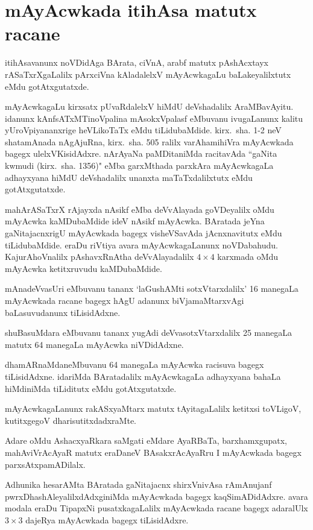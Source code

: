 \chapter{mAyAcwkada itihAsa matutx racane}

itihAsavanunx noVDidAga BArata, ciVnA, arabf matutx pAshAcxtayx rASaTxrXgaLalilx pArxciVna kAladalelxV mAyAcwkagaLu baLakeyalilxtutx eMdu gotAtxgutatxde.

mAyAcwkagaLu kirxsatx pUvaRdalelxV hiMdU deVshadalilx AraMBavAyitu. idanunx kAnfsATxMTinoVpalina mAsokxVpalasf eMbuvanu ivugaLanunx kalitu yUroVpiyananxrige heVLikoTaTx eMdu tiLidubaMdide. kirx.~sha. {\rm 1-2} neV shatamAnada nAgAjuRna, kirx.~sha. {\rm 505} ralilx varAhamihiVra mAyAcwkada bagegx ulelxVKisidAdxre. nArAyaNa paMDitaniMda racitavAda ``gaNita kwmudi (kirx.~sha. {\rm 1356})" eMba garxMthada parxkAra mAyAcwkagaLa adhayxyana hiMdU deVshadalilx unanxta maTaTxdalilxtutx eMdu gotAtxgutatxde.

mahArASaTxrX rAjayxda nAsikf eMba deVvAlayada goVDeyalilx oMdu mAyAcwka kaMDubaMdide ideV nAsikf mAyAcwka. BAratada jeYna gaNitajacnxrigU mAyAcwkada bagegx visheVSavAda jAcnxnavitutx eMdu tiLidubaMdide. eraDu riVtiya avara mAyAcwkagaLanunx noVDabahudu. KajurAhoVnalilx pAshavxRnAtha deVvAlayadalilx $4\times 4$ karxmada oMdu mAyAcwka ketitxruvudu kaMDubaMdide.

mAnadeVvasUri eMbuvanu tananx `laGushAMti sotxVtarxdalilx' {\rm 16} manegaLa mAyAcwkada racane bagegx hAgU adanunx biVjamaMtarxvAgi baLasuvudanunx tiLisi\-dAdxne.

shuBasuMdara eMbuvanu tananx yugAdi deVvasotxVtarxdalilx {\rm 25} manegaLa matutx {\rm 64} manegaLa mAyAcwka niVDidAdxne.

dhamARnaMdaneMbuvanu {\rm 64} manegaLa mAyAcwka racisuva bagegx tiLisidAdxne. idariMda BAratadalilx mAyAcwkagaLa adhayxyana bahaLa hiMdiniMda tiLiditutx eMdu gotAtxgutatxde.

mAyAcwkagaLanunx rakASxyaMtarx matutx tAyitagaLalilx ketitxsi toVLigoV, kutitxgegoV dharisutitxdadxraMte.

Adare oMdu AshacxyaRkara saMgati eMdare AyaRBaTa, barxhamxgupatx, mahAviVrA\-cAyaR matutx eraDaneV BAsakxrAcAyaRru I mAyAcwkada bagegx parxsAtxpamADilalx.

Adhunika hesarAMta BAratada gaNitajacnx shirxVnivAsa rAmAnujanf pwrxDhashAleyalilx\-dAdxginiMda mAyAcwkada bagegx kaqSimADidAdxre. avara modala eraDu TipapxNi pusatxka\-gaLalilx mAyAcwkada racane bagegx adaralUlx $3\times 3$ dajeRya mAyAcwkada bagegx tiLisidAdxre.

